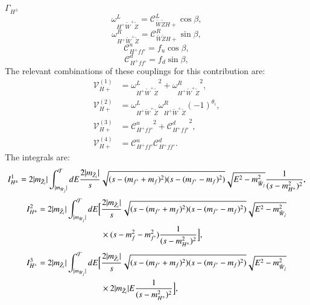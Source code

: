 \documentclass[final,3p,times,pdflatex]{elsarticle}
\begin{document}
\textbf{\underline{$\Gamma_{H^{\pm}}$}}
\begin{equation}
\omega_{H^+ \tilde{W}^+ \tilde{Z}}^L = \mathcal{C}_{\tilde{W} \tilde{Z} H+}^L  \cos\beta,
\end{equation}
\begin{equation}
\omega_{H^+ \tilde{W}^+ \tilde{Z}}^R = \mathcal{C}_{\tilde{W} \tilde{Z} H+}^R  \sin\beta,
\end{equation}
\begin{equation}
\mathcal{C}_{H^+ f f'}^u = f_{u}\cos\beta,
\end{equation}
\begin{equation}
\mathcal{C}_{H^+ f f'}^d = f_{d}\sin\beta,
\end{equation}
The relevant combinations of these couplings for this contribution are:
\begin{align}
\mathcal{V}_{H+}^{(1)} &= {\omega_{H^+ \tilde{W}^+ \tilde{Z}}^L}^2 + {\omega_{H^+ \tilde{W}^+ \tilde{Z}}^R}^2, \\
\mathcal{V}_{H+}^{(2)} &= \omega_{H^+ \tilde{W}^+ \tilde{Z}}^L  \omega_{H^+ \tilde{W}^+ \tilde{Z}}^R  (-1)^{\theta_i}, \\
\mathcal{V}_{H+}^{(3)} &= {\mathcal{C}_{H^+ f f'}^u}^2 + {\mathcal{C}_{H^+ f f'}^d}^2, \\
\mathcal{V}_{H+}^{(4)} &= \mathcal{C}_{H^+ f f'}^u  \mathcal{C}_{H^+ f f'}^d.
\end{align}
The integrals are:
\begin{equation}  \label{IHpm1}
I_{H^{\pm}}^{1} = 2|m_{\tilde{Z}_i}| \int_{|m_{\tilde{W}_{j}}|}^{\mathcal{T}} dE {2|m_{\tilde{Z}_i}| \over s} \sqrt{(s-(m_{f'}+m_{f})^2)(s-(m_{f'}-m_{f})^2)} \sqrt{E^2 - m_{\tilde{W}_j}^2}{1 \over (s - m_{H^{\pm}}^2)^2},
\end{equation}
\begin{equation} \label{IHpm2}
\begin{aligned}
I_{H^{\pm}}^{2} = 2|m_{\tilde{Z}_i}| \int_{|m_{\tilde{W}_{j}}|}^{\mathcal{T}} dE \Big[ &{2|m_{\tilde{Z}_i}| \over s} \sqrt{(s-(m_{f'}+m_{f})^2)(s-(m_{f'}-m_{f})^2)} \sqrt{E^2 - m_{\tilde{W}_j}^2} \\ & \times (s-m_{f}^2 - m_{f'}^2){1 \over (s - m_{H^{\pm}}^2)^2}\Big],
\end{aligned}
\end{equation}
\begin{equation} \label{IHpm3}
\begin{aligned}
I_{H^{\pm}}^{3} = 2|m_{\tilde{Z}_i}| \int_{|m_{\tilde{W}_{j}}|}^{\mathcal{T}} dE \Big[ &{2|m_{\tilde{Z}_i}| \over s} \sqrt{(s-(m_{f'}+m_{f})^2)(s-(m_{f'}-m_{f})^2)} \sqrt{E^2 - m_{\tilde{W}_j}^2} \\ & \times 2|m_{\tilde{Z}_i}|E{1 \over (s - m_{H^{\pm}}^2)^2}\Big],
\end{aligned}
\end{equation}
\end{document}
